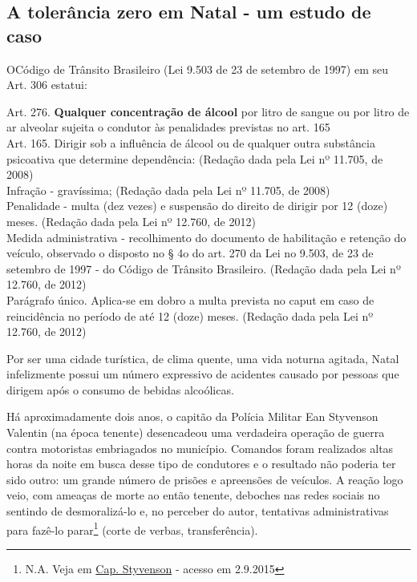 \documentclass[
	12pt,				%
	openright,			%
	twoside,			%
	a4paper,			%
	chapter=TITLE,		%
	section=TITLE,		%
	subsection=TITLE,	%
	subsubsection=TITLE,%
	spanish,            %
	english,			%
	brazil				%
	]{abntex2}
\begin{document}
\subsection{A tolerância zero em Natal - um estudo de caso}
\lettrine[lines=2, lhang=0.33, loversize=0.25]{O} Código de Trânsito Brasileiro (Lei 9.503  de 23 de setembro de 1997)  em seu Art. 306 estatui:
\begin{citacao}
	 Art. 276.  \textbf{Qualquer concentração de álcool} por litro de sangue ou por litro de ar alveolar sujeita o condutor às penalidades previstas no art. 165\\
	  Art. 165.  Dirigir sob a influência de álcool ou de qualquer outra substância psicoativa que determine dependência:       (Redação dada pela Lei nº 11.705, de 2008)\\
	  Infração - gravíssima;       (Redação dada pela Lei nº 11.705, de 2008) \\
	  Penalidade - multa (dez vezes) e suspensão do direito de dirigir por 12 (doze) meses.         (Redação dada pela Lei nº 12.760, de 2012)\\
	  Medida administrativa - recolhimento do documento de habilitação e retenção do veículo, observado o disposto no § 4o do art. 270 da Lei no 9.503, de 23 de setembro de 1997 - do Código de Trânsito Brasileiro.      (Redação dada pela Lei nº 12.760, de 2012)\\
	  Parágrafo único. Aplica-se em dobro a multa prevista no caput em caso de reincidência no período de até 12 (doze) meses. (Redação dada pela Lei nº 12.760, de 2012) \cite{CTB}
\end{citacao}
\par
Por ser uma cidade turística, de clima quente, uma vida noturna agitada, Natal infelizmente possui um número expressivo de acidentes causado por pessoas que dirigem após  o consumo de bebidas alcoólicas.
\par
Há aproximadamente dois anos, o capitão da Polícia Militar Ean Styvenson Valentin (na época tenente) desencadeou uma verdadeira operação de guerra
contra motoristas embriagados no município. Comandos foram realizados altas horas da noite em busca desse tipo de condutores e o resultado não
poderia ter sido outro: um grande número de prisões e apreensões de veículos. A reação logo veio, com ameaças de morte ao então tenente,
deboches nas redes sociais no sentindo de desmoralizá-lo e, no perceber do autor, tentativas administrativas para fazê-lo parar\footnote{N.A. Veja em  \href{http://tribunadonorte.com.br/noticia/apa-s-anaoncio-de-saa-da-styvenson-retorna-a-coordenaa-a-o-da-lei-seca/310527?utm_campaign=noticias&utm_source=20150408}{Cap. Styvenson} - acesso em 2.9.2015} (corte de verbas, transferência).
\end{document}
